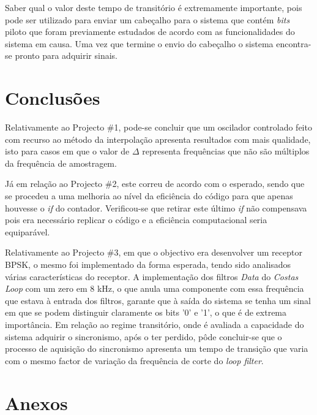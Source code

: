\documentclass[11pt]{article}
\numberwithin{equation}{section}
\begin{document}
{Saber qual o valor deste tempo de transitório é extremamente importante, pois pode ser utilizado para enviar um cabeçalho para o sistema que contém \textit{bits} piloto que foram previamente estudados de acordo com as funcionalidades do sistema em causa. Uma vez que termine o envio do cabeçalho o sistema encontra-se pronto para adquirir sinais.

\section{Conclusões}

Relativamente ao Projecto \#1, pode-se concluir que um oscilador controlado feito com recurso ao método da interpolação apresenta resultados com mais qualidade, isto para casos em que o valor de $\Delta$ representa frequências que não são múltiplos da frequência de amostragem. 

Já em relação ao Projecto \#2, este correu de acordo com o esperado, sendo que se procedeu a uma melhoria ao nível da eficiência do código para que apenas houvesse o \textit{if} do contador. Verificou-se que retirar este último \textit{if} não compensava pois era necessário replicar o código e a eficiência computacional seria equiparável.

Relativamente ao Projecto \#3, em que o objectivo era desenvolver um receptor BPSK, o mesmo foi implementado da forma esperada, tendo sido analisados várias características do receptor. A implementação dos filtros \textit{Data} do \textit{Costas Loop} com um zero em 8 kHz, o que anula uma componente com essa frequência que estava à entrada dos filtros, garante que à saída do sistema se tenha um sinal em que se podem distinguir claramente os bits '0' e '1', o que é de extrema importância. Em relação ao regime transitório, onde é avaliada a capacidade do sistema adquirir o sincronismo, após o ter perdido, pôde concluir-se que o processo de aquisição do sincronismo apresenta um tempo de transição que varia com o mesmo factor de variação da frequência de corte do \textit{loop filter}. 




\pagebreak

\section{Anexos}

}
\end{document}

